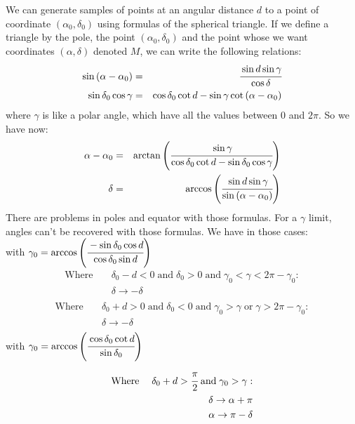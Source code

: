 We can generate samples of points at an angular distance $d$ to a point of
coordinate $(\alpha_0,\delta_0)$ using formulas of the spherical triangle. If
we define a triangle by the pole, the point $(\alpha_0,\delta_0)$ and the point
whose we want coordinates $(\alpha,\delta)$ denoted $M$, we can write the
following relations:
%
\begin{eqnarray}
        \sin\left(\alpha-\alpha_0\right)&=&\cfrac{\sin{d}\sin\gamma}{\cos\delta}\nonumber\\
        \sin\delta_0\cos\gamma&=&\cos\delta_0\cot{d}-\sin\gamma\cot\left(\alpha-\alpha_0\right)\nonumber\\
\end{eqnarray}
%
where $\gamma$ is like a polar angle, which have all the values between 0 and $2\pi$.
So we have now:
%
\begin{eqnarray}
        \alpha-\alpha_0 &=& \arctan\left(\cfrac{\sin\gamma}{\cos\delta_0\cot{d}-\sin\delta_0\cos\gamma}\right)\nonumber\\
        \delta &=& \arccos\left(\cfrac{\sin{d}\sin\gamma}{\sin\left(\alpha-\alpha_0\right)}\right)\nonumber\\
\end{eqnarray}
%
There are problems in poles and equator with those formulas. For a $\gamma$
limit, angles can't be recovered with those formulas. We have in those cases:\\
with $\gamma_0=\arccos\left(\cfrac{-\sin\delta_0\cos{d}}{\cos\delta_0\sin{d}}\right)$
%
\begin{eqnarray}
        \mathrm{Where}&\;& \delta_0-d<0\; \mathrm{and} \;\delta_0>0 \; \mathrm{and}\; \gamma_0<\gamma<2\pi-\gamma_0:\nonumber\\
        & & \delta\rightarrow-\delta\nonumber\\
\end{eqnarray}
%
\begin{eqnarray}
        \mathrm{Where}&\;& \delta_0+d>0\; \mathrm{and}\;\delta_0<0 \; \mathrm{and}\; \gamma_0>\gamma\;\mathrm{or}\;\gamma>2\pi-\gamma_0:\nonumber\\
        & & \delta\rightarrow-\delta\nonumber\\
\end{eqnarray}
%
with $\gamma_0=\arccos\left(\cfrac{\cos\delta_0\cot{d}}{\sin\delta_0}\right)$
%
\begin{eqnarray}
        \mathrm{Where}&\;& \delta_0+d>\cfrac{\pi}{2} \; \mathrm{and}\; \gamma_0>\gamma:\nonumber\\
        & & \delta\rightarrow\alpha+\pi\nonumber\\
        & & \alpha\rightarrow\pi-\delta\nonumber\\
\end{eqnarray}
